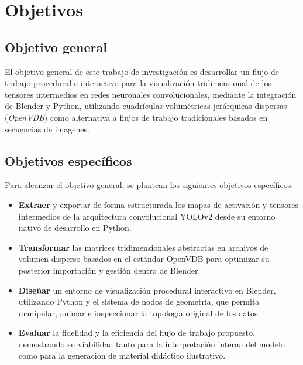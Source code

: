 \section{Objetivos}

\subsection{Objetivo general}
El objetivo general de este trabajo de investigación es desarrollar un flujo de trabajo
procedural e interactivo para la visualización tridimensional de los tensores intermedios en
redes neuronales convolucionales, mediante la integración de Blender y Python, utilizando cuadrículas 
volumétricas jerárquicas dispersas (\textit{OpenVDB}) como alternativa a flujos de trabajo tradicionales
basados en secuencias de imagenes.

\subsection{Objetivos específicos}
Para alcanzar el objetivo general, se plantean los siguientes objetivos específicos:
\begin{itemize}
    \item \textbf{Extraer} y exportar de forma estructurada los mapas de activación y tensores intermedios
    de la arquitectura convolucional YOLOv2 desde su entorno nativo de desarrollo en Python.
    \item \textbf{Transformar} las matrices tridimensionales abstractas en archivos de volumen disperso basados
    en el estándar OpenVDB para optimizar su posterior importación y gestión dentro de Blender.
    \item \textbf{Diseñar} un entorno de visualización procedural interactivo en Blender, utilizando Python y el 
    sistema de nodos de geometría, que permita manipular, animar e inspeccionar la topología original de los datos.
    \item \textbf{Evaluar} la fidelidad y la eficiencia del flujo de trabajo propuesto, demostrando su viabilidad 
    tanto para la interpretación interna del modelo como para la generación de material didáctico ilustrativo.
\end{itemize}